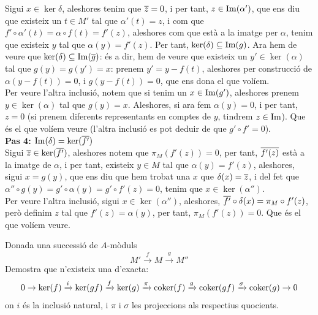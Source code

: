 \documentclass[11pt, a4paper]{article}
\begin{document}
Sigui $x \in \ker \delta$, aleshores tenim que $\overline z=0$, i per tant, $z\in \operatorname{Im}(\alpha')$, que ens diu que existeix un $t\in M'$ tal que $\alpha'(t)=z$, i com que $f'\circ\alpha'(t)=\alpha\circ f(t)=f'(z)$, aleshores com que està a la imatge per $\alpha$, tenim que existeix $y$ tal que $\alpha(y)=f'(z)$. Per tant, $\ker (\delta)\subseteq \operatorname{Im}(g)$. Ara hem de veure que $\ker(\delta)\subseteq \operatorname{Im}(\overline g)$: és a dir, hem de veure que existeix un $y'\in\ker(\alpha)$ tal que $g(y)=g(y')=x$: prenem $y'=y-f(t)$, aleshores per construcció de $\alpha(y-f(t))=0$, i $g(y-f(t))=0$, que ens dona el que volíem.\\
Per veure l'altra inclusió, notem que si tenim un $x\in \operatorname{Im}(g')$, aleshores prenem $y\in \ker(\alpha)$ tal que $g(y)=x$. Aleshores, si ara fem $\alpha(y)=0$, i per tant, $z=0$ (si prenem diferents representants en comptes de $y$, tindrem $z\in \operatorname{Im}$). Que és el que volíem veure (l'altra inclusió es pot deduir de que $g'\circ f'=0$).\\[5mm]
\textbf{Pas 4: $\operatorname{Im}(\delta)=\ker(\overline{f'})$}\\
Sigui $\overline z\in \ker(\overline{f'})$, aleshores notem que $\pi_M(f'(z))=0$, per tant, $\overline{f'(z)}$ està a la imatge de $\alpha$, i per tant, existeix $y\in M$ tal que $\alpha(y)=f'(z)$, aleshores, sigui $x=g(y)$, que ens diu que hem trobat una $x$ que $\delta(x)=\overline z$, i del fet que $\alpha''\circ g(y)=g'\circ \alpha(y)=g'\circ f'(z)=0$, tenim que $x\in \ker(\alpha'')$.\\
Per veure l'altra inclusió, sigui $x\in \ker(\alpha'')$, aleshores, $\overline{f'}\circ\delta(x)=\pi_M\circ f'(z)$, però definim $z$ tal que $f'(z)=\alpha(y)$, per tant, $\pi_M(f'(z))=0$. Que és el que volíem veure.
\newpage
\begin{tcolorbox}[title=\section{Exercici 37}]
    Donada una successió de $A$-mòduls
    \[
        M'\xrightarrow{f}M\xrightarrow{g}M''
    \]
    Demostra que n'existeix una d'exacta:
    \[
        0\to \ker(f)\xrightarrow{i}\ker(gf)\xrightarrow{f}\ker(g)\xrightarrow{\pi}\operatorname*{coker}(f)\xrightarrow{g}\operatorname*{coker}(gf)\xrightarrow{\sigma}\operatorname*{coker}(g)\to 0
    \]
    on $i$ és la inclusió natural, i $\pi$ i $\sigma$ les projeccions als respectius quocients.
\end{tcolorbox}
\end{document}
